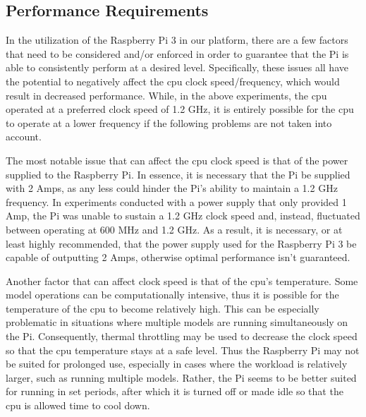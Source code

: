 \subsection{Performance Requirements}
In the utilization of the Raspberry Pi 3 in our platform, there are a few factors that need to be 
considered and/or enforced in order to guarantee that the Pi is able to consistently perform at a 
desired level. Specifically, these issues all have the potential to negatively affect the cpu clock 
speed/frequency, which would result in decreased performance. While, in the above experiments, the cpu 
operated at a preferred clock speed of 1.2 GHz, it is entirely possible for the cpu to operate at a 
lower frequency if the following problems are not taken into account.

The most notable issue that can affect the cpu clock speed is that of the power supplied to the 
Raspberry Pi. In essence, it is necessary that the Pi be supplied with 2 Amps, as any less could 
hinder the Pi's ability to maintain a 1.2 GHz frequency. In experiments conducted with a power supply that 
only provided 1 Amp, the Pi was unable to sustain a 1.2 GHz clock speed and, instead, fluctuated 
between operating at 600 MHz and 1.2 GHz. As a result, it is necessary, or at least highly 
recommended, that the power supply used for the Raspberry Pi 3 be capable of outputting 2 Amps, 
otherwise optimal performance isn't guaranteed.

Another factor that can affect clock speed is that of the cpu's temperature. Some model operations can 
be computationally intensive, thus it is possible for the temperature of the cpu to become relatively 
high. This can be especially problematic in situations where multiple models are running 
simultaneously on the Pi. Consequently, thermal throttling may be used to decrease the clock 
speed so that the cpu temperature stays at a safe level. Thus the Raspberry Pi may not be suited 
for prolonged use, especially in cases where the workload is relatively larger, such as running multiple 
models. Rather, the Pi seems to be better suited for running in set periods, after which it is turned 
off or made idle so that the cpu is allowed time to cool down.
